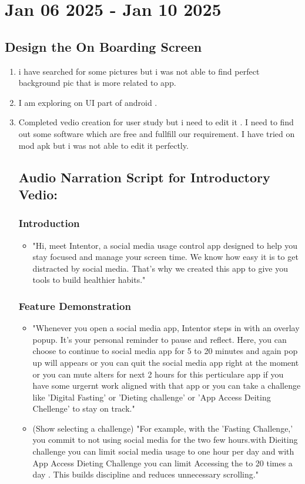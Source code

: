 \documentclass[12pt]{article}
\begin{document}
    \section{Jan 06 2025 - Jan 10 2025}
    \subsection{Design the On Boarding Screen}
    \begin{enumerate}
        \item i have searched for some pictures but i was not able to find perfect background pic that is more related to app.
        \item I am exploring on UI part of android .
        \item Completed vedio creation for user study but i need to edit it . I need to find out some software which are free and fullfill our requirement. I have tried on mod apk but i was not able to edit it perfectly.
    \subsection{Audio Narration Script for Introductory Vedio:}
    \subsubsection{Introduction}
    \begin{itemize}
        \item "Hi, meet Intentor, a social media usage control app designed to help you stay focused and manage your screen time. We know how easy it is to get distracted by social media. That's why we created this app to give you tools to build healthier habits."
    \end{itemize}
    \subsubsection{Feature Demonstration}
    \begin{itemize}
    \item "Whenever you open a social media app, Intentor steps in with an overlay popup. It’s your personal reminder to pause and reflect. Here, you can choose to continue to social media app for 5 to 20 minutes and again pop up will appears or you can quit the social media app right at the moment or you can mute alters for next 2 hours for this perticulare app if you have some urgernt work aligned with that app or you can take  a challenge like 'Digital Fasting' or 'Dieting challenge' or 'App Access Deiting Chellenge' to stay on track."
    \item (Show selecting a challenge) "For example, with the 'Fasting Challenge,' you commit to not using social media for the two few hours.with Dieiting challenge you can limit social media usage to one hour per day and with App Access Dieting Challenge you can limit Accessing the to 20 times a day . This builds discipline and reduces unnecessary scrolling."
    \end{itemize}

\end{enumerate}
\end{document}
